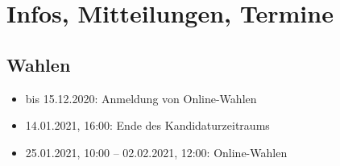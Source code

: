 \section{Infos, Mitteilungen, Termine}


\subsection{Wahlen}
\begin{itemize}
    \item bis 15.12.2020: Anmeldung von Online-Wahlen
    \item 14.01.2021, 16:00: Ende des Kandidaturzeitraums
    \item 25.01.2021, 10:00 – 02.02.2021, 12:00: Online-Wahlen
\end{itemize}